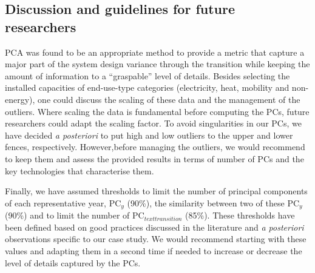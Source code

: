 \subsection{Discussion and guidelines for future researchers}
\label{subsec:meth:PCA:discussion}
\acrfull{PCA} was found to be an appropriate method to provide a metric that capture a major part of the system design variance through the transition while keeping the amount of information to a ``graspable'' level of details. Besides selecting the installed capacities of end-use-type categories (electricity, heat, mobility and non-energy), one could discuss the scaling of these data and the management of the outliers. Where scaling the data is fundamental before computing the PCs, future researchers could adapt the scaling factor. To avoid singularities in our PCs, we have decided \textit{a posteriori} to put high and low outliers to the upper and lower fences, respectively. However,before managing the outliers, we would recommend to keep them and assess the provided results in terms of number of PCs and the key technologies that characterise them.

Finally, we have assumed thresholds to limit the number of principal components of each representative year, $\text{PC}_y$ (90\%), the similarity between two of these $\text{PC}_y$ (90\%) and to limit the number of $\text{PC}_{text{transition}}$ (85\%). These thresholds have been defined based on good practices discussed in the literature and \textit{a posteriori} observations specific to our case study. We would recommend starting with these values and adapting them in a second time if needed to increase or decrease the level of details captured by the PCs.